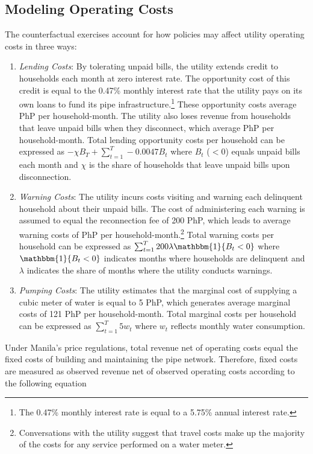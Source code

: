 \documentclass[12pt,table]{article}
\begin{document}
\subsection{Modeling Operating Costs}

The counterfactual exercises account for how policies may affect utility operating costs in three ways:
\begin{enumerate}
	\item \textit{Lending Costs}:  By tolerating unpaid bills, the utility extends credit to households each month at zero interest rate.  The opportunity cost of this credit is equal to the 0.47\% monthly interest rate that the utility pays on its own loans to fund its pipe infrastructure.\footnote{The 0.47\% monthly interest rate is equal to a 5.75\% annual interest rate.}  These opportunity costs average PhP per household-month.  The utility also loses revenue from households that leave unpaid bills when they disconnect, which average PhP per household-month.  Total lending opportunity costs per household can be expressed as $ - \chi B_T + \sum_{t=1}^{T}  - 0.0047 B_t $ where $B_t$ ($<0$) equals unpaid bills each month and $\chi$ is the share of households that leave unpaid bills upon disconnection.

	\item \textit{Warning Costs}:  The utility incurs costs visiting and warning each delinquent household about their unpaid bills.  The cost of administering each warning is assumed to equal the reconnection fee of 200 PhP, which leads to average warning costs of PhP per household-month.\footnote{Conversations with the utility suggest that travel costs make up the majority of the costs for any service performed on a water meter.}  Total warning costs per household can be expressed as  $\sum_{t=1}^{T} 200 \lambda \mathbbm{1}\{B_t < 0 \}  $ where $ \mathbbm{1}\{B_t < 0 \}$ indicates months where households are delinquent and $\lambda$ indicates the share of months where the utility conducts warnings.

	\item \textit{Pumping Costs}: The utility estimates that the marginal cost of supplying a cubic meter of water is equal to 5 PhP, which generates average marginal costs of 121 PhP per household-month.  Total marginal costs per household can be expressed as $\sum_{t=1}^{T} 5 w_t  $ where $w_t$ reflects monthly water consumption.
\end{enumerate}
Under Manila's price regulations, total revenue net of operating costs equal the fixed costs of building and maintaining the pipe network.  Therefore, fixed costs are measured as observed revenue net of observed operating costs according to the following equation
\end{document}
